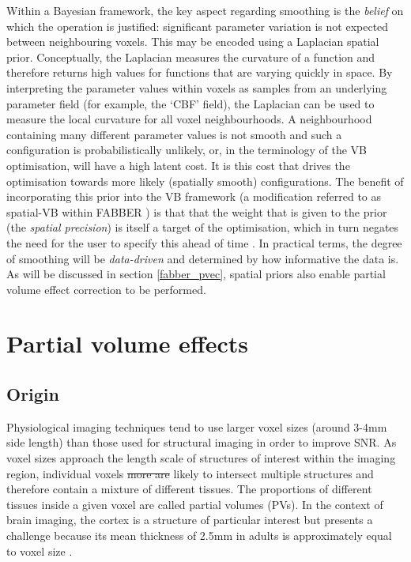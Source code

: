 \documentclass[12pt]{report}
\providecommand{\DIFaddtex}[1]{{\protect\color{blue}\uwave{#1}}} %
\providecommand{\DIFdeltex}[1]{{\protect\color{red}\sout{#1}}}                      %
\providecommand{\DIFaddbegin}{} %
\providecommand{\DIFaddend}{} %
\providecommand{\DIFdelbegin}{} %
\providecommand{\DIFdelend}{} %
\providecommand{\DIFadd}[1]{\texorpdfstring{\DIFaddtex{#1}}{#1}} %
\providecommand{\DIFdel}[1]{\texorpdfstring{\DIFdeltex{#1}}{}} %
\newcommand{\DIFscaledelfig}{0.5}
\newlength{\DIFdelgraphicswidth} %
\newlength{\DIFdelgraphicsheight} %
\newcommand{\DIFaddincludegraphics}[2][]{{\color{blue}\fbox{\DIFOincludegraphics[#1]{#2}}}} %
\newcommand{\DIFdelincludegraphics}[2][]{%
\sbox{\DIFdelgraphicsbox}{\DIFOincludegraphics[#1]{#2}}%
\settoboxwidth{\DIFdelgraphicswidth}{\DIFdelgraphicsbox} %
\settoboxtotalheight{\DIFdelgraphicsheight}{\DIFdelgraphicsbox} %
\scalebox{\DIFscaledelfig}{%
\parbox[b]{\DIFdelgraphicswidth}{\usebox{\DIFdelgraphicsbox}\\[-\baselineskip] \rule{\DIFdelgraphicswidth}{0em}}\llap{\resizebox{\DIFdelgraphicswidth}{\DIFdelgraphicsheight}{%
\setlength{\unitlength}{\DIFdelgraphicswidth}%
\begin{picture}(1,1)%
\thicklines\linethickness{2pt} %
{\color[rgb]{1,0,0}\put(0,0){\framebox(1,1){}}}%
{\color[rgb]{1,0,0}\put(0,0){\line( 1,1){1}}}%
{\color[rgb]{1,0,0}\put(0,1){\line(1,-1){1}}}%
\end{picture}%
}\hspace*{3pt}}} %
} %
\DeclareRobustCommand{\DIFaddbegin}{\DIFOaddbegin \let\includegraphics\DIFaddincludegraphics} %
\DeclareRobustCommand{\DIFaddend}{\DIFOaddend \let\includegraphics\DIFOincludegraphics} %
\DeclareRobustCommand{\DIFdelbegin}{\DIFOdelbegin \let\includegraphics\DIFdelincludegraphics} %
\DeclareRobustCommand{\DIFdelend}{\DIFOaddend \let\includegraphics\DIFOincludegraphics} %
\begin{document}
Within a Bayesian framework, the key aspect regarding smoothing is the \textit{belief} on which the operation is justified: significant parameter variation is not expected between neighbouring voxels. This may be encoded using a Laplacian spatial prior. Conceptually, the Laplacian measures the curvature of a function and therefore returns high values for functions that are varying quickly in space. By interpreting the parameter values within voxels as samples from an underlying parameter field (for example, the `CBF' field), the Laplacian can be used to measure the local curvature for all voxel neighbourhoods. A neighbourhood containing many different parameter values is not smooth and such a configuration is probabilistically unlikely, or, in the terminology of the VB optimisation, will have a high latent cost. It is this cost that drives the optimisation towards more likely (spatially smooth) configurations. The benefit of incorporating this prior into the VB framework (a modification referred to as spatial-VB within FABBER \cite{Chappell2011}) is that that the weight that is given to the prior (the \textit{spatial precision}) is itself a target of the optimisation, which in turn negates the need for the user to specify this ahead of time \cite{Penny2005}. In practical terms, the degree of smoothing will be \textit{data-driven} and determined by how informative the data is. As will be discussed in section \ref{fabber_pvec}, spatial priors also enable partial volume effect correction to be performed. 


\section{Partial volume effects}

\subsection{Origin}

Physiological imaging techniques tend to use larger voxel sizes (around 3-4mm side length) than those used for structural imaging in order to improve SNR. As voxel sizes approach the length scale of structures of interest within the imaging region, individual voxels \DIFdelbegin \DIFdel{more are }\DIFdelend \DIFaddbegin \DIFadd{are more }\DIFaddend likely to intersect multiple structures and therefore contain a mixture of different tissues. The proportions of different tissues inside a given voxel are called partial volumes (PVs). In the context of brain imaging, the cortex is a structure of particular interest but presents a challenge because its mean thickness of 2.5mm in adults is approximately equal to voxel size \cite{Fischl1999a}.  
\end{document}
